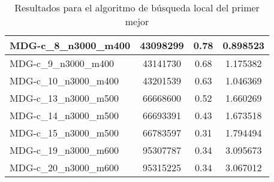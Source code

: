 \documentclass[10pt,a4paper]{article}
\begin{document}
\begin{table}[H]
\begin{center}
\begin{tabular}{|l|c|c|c|}
			MDG-c\_8\_n3000\_m400 & 43098299 & 0.78 & 0.898523 \\ \hline
			MDG-c\_9\_n3000\_m400 & 43141730 & 0.68 & 1.175382 \\ \hline
			MDG-c\_10\_n3000\_m400 & 43201539 & 0.63 & 1.046369 \\ \hline
			MDG-c\_13\_n3000\_m500 & 66668600 & 0.52 & 1.660269 \\ \hline
			MDG-c\_14\_n3000\_m500 & 66693391 & 0.43 & 1.673518 \\ \hline
			MDG-c\_15\_n3000\_m500 & 66783597 & 0.31 & 1.794494 \\ \hline
			MDG-c\_19\_n3000\_m600 & 95307787 & 0.34 & 3.095673 \\ \hline
			MDG-c\_20\_n3000\_m600 & 95315225 & 0.34 & 3.067012 \\ \hline
		\end{tabular}
	\end{center}
	\caption{Resultados para el algoritmo de búsqueda local del primer mejor}
	\label{}
\end{table}
\newpage
\end{document}
